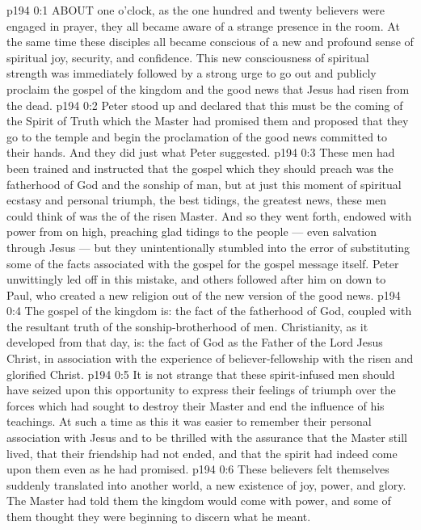 \vs p194 0:1 ABOUT one o’clock, as the one hundred and twenty believers were engaged in prayer, they all became aware of a strange presence in the room. At the same time these disciples all became conscious of a new and profound sense of spiritual joy, security, and confidence. This new consciousness of spiritual strength was immediately followed by a strong urge to go out and publicly proclaim the gospel of the kingdom and the good news that Jesus had risen from the dead.
\vs p194 0:2 Peter stood up and declared that this must be the coming of the Spirit of Truth which the Master had promised them and proposed that they go to the temple and begin the proclamation of the good news committed to their hands. And they did just what Peter suggested.
\vs p194 0:3 \pc These men had been trained and instructed that the gospel which they should preach was the fatherhood of God and the sonship of man, but at just this moment of spiritual ecstasy and personal triumph, the best tidings, the greatest news, these men could think of was the  of the risen Master. And so they went forth, endowed with power from on high, preaching glad tidings to the people --- even salvation through Jesus --- but they unintentionally stumbled into the error of substituting some of the facts associated with the gospel for the gospel message itself. Peter unwittingly led off in this mistake, and others followed after him on down to Paul, who created a new religion out of the new version of the good news.
\vs p194 0:4 The gospel of the kingdom is: the fact of the fatherhood of God, coupled with the resultant truth of the sonship\hyp{}brotherhood of men. Christianity, as it developed from that day, is: the fact of God as the Father of the Lord Jesus Christ, in association with the experience of believer\hyp{}fellowship with the risen and glorified Christ.
\vs p194 0:5 It is not strange that these spirit\hyp{}infused men should have seized upon this opportunity to express their feelings of triumph over the forces which had sought to destroy their Master and end the influence of his teachings. At such a time as this it was easier to remember their personal association with Jesus and to be thrilled with the assurance that the Master still lived, that their friendship had not ended, and that the spirit had indeed come upon them even as he had promised.
\vs p194 0:6 These believers felt themselves suddenly translated into another world, a new existence of joy, power, and glory. The Master had told them the kingdom would come with power, and some of them thought they were beginning to discern what he meant.
